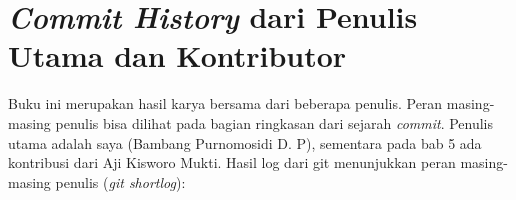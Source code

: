 \chapter{\textit{Commit History} dari Penulis Utama dan Kontributor}

Buku ini merupakan hasil karya bersama dari beberapa penulis. Peran masing-masing penulis bisa dilihat pada bagian ringkasan dari sejarah \textit{commit}. Penulis utama adalah saya (Bambang Purnomosidi D. P), sementara pada bab 5 ada kontribusi dari Aji Kisworo Mukti. Hasil log dari git menunjukkan peran masing-masing penulis (\textit{git shortlog}):


